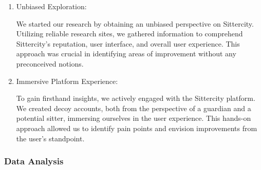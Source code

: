 \documentclass[12pt]{article}
\begin{document}
\begin{enumerate}
\def\labelenumi{\arabic{enumi}.}
\item
  Unbiased Exploration:

  We started our research by obtaining an unbiased perspective on
  Sittercity. Utilizing reliable research sites, we gathered information
  to comprehend Sittercity's reputation, user interface, and overall
  user experience. This approach was crucial in identifying areas of
  improvement without any preconceived notions.
\item
  Immersive Platform Experience:

  To gain firsthand insights, we actively engaged with the Sittercity
  platform. We created decoy accounts, both from the perspective of a
  guardian and a potential sitter, immersing ourselves in the user
  experience. This hands-on approach allowed us to identify pain points
  and envision improvements from the user's standpoint.
\end{enumerate}

\hypertarget{data-analysis}{%
\subsubsection{Data Analysis}\label{data-analysis}}
\end{document}
